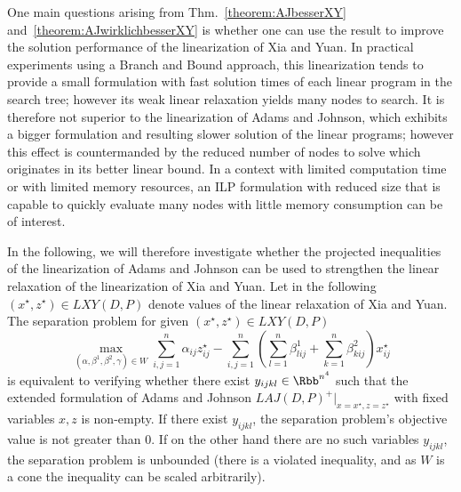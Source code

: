 One main questions arising from Thm.~\ref{theorem:AJbesserXY} and~\ref{theorem:AJwirklichbesserXY} is whether one can use the result to improve the solution performance of the linearization of Xia and Yuan. In practical experiments using a Branch and Bound approach, this linearization tends to provide a small formulation with fast solution times of each linear program in the search tree; however its weak linear relaxation yields many nodes to search. It is therefore not superior to the linearization of Adams and Johnson, which exhibits a bigger formulation and resulting slower solution of the linear programs; however this effect is countermanded by the reduced number of nodes to solve which originates in its better linear bound. In a context with limited computation time or with limited memory resources, an ILP formulation with reduced size that is capable to quickly evaluate many nodes with little memory consumption can be of interest.

In the following, we will therefore investigate whether the projected inequalities of the linearization of Adams and Johnson can be used to strengthen the linear relaxation of the linearization of Xia and Yuan. Let in the following $(x^\star, z^\star) \in LXY(D,P)$ denote values of the linear relaxation of Xia and Yuan. The separation problem for given $(x^\star, z^\star)\in LXY(D,P)$
\begin{equation*}
	\max_{(\alpha,\beta^1,\beta^2,\gamma)\in W}\sum_{i,j=1}^n\alpha_{ij}z^\star_{ij} - \sum_{i,j=1}^n \left(\sum_{l=1}^n \beta^1_{lij} + \sum_{k=1}^n\beta^2_{kij}\right)x^\star_{ij} 
\end{equation*}
is equivalent to verifying whether there exist $y_{ijkl}\in\Rbb^{n^4}$ such that the extended formulation of Adams and Johnson $LAJ(D,P)^+|_{x=x^\star,z=z^\star}$ with fixed variables $x, z$ is non-empty. If there exist $y_{ijkl}$, the separation problem's objective value is not greater than 0. If on the other hand there are no such variables $y_{ijkl}$, the separation problem is unbounded (\ie there is a violated inequality, and as $W$ is a cone the inequality can be scaled arbitrarily). 


